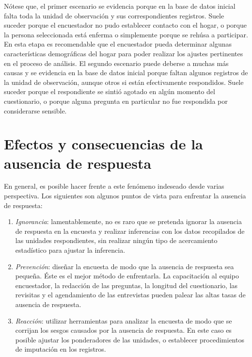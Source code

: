 \documentclass[
  12pt,
  spanish,
]{book}
\providecommand{\tightlist}{%
  \setlength{\itemsep}{0pt}\setlength{\parskip}{0pt}}
\begin{document}
Nótese que, el primer escenario se evidencia porque en la base de datos inicial falta toda la unidad de observación y sus correspondientes registros. Suele suceder porque el encuestador no pudo establecer contacto con el hogar, o porque la persona seleccionada está enferma o simplemente porque se rehúsa a participar. En esta etapa es recomendable que el encuestador pueda determinar algunas características demográficas del hogar para poder realizar los ajustes pertinentes en el proceso de análisis. El segundo escenario puede deberse a muchas más causas y se evidencia en la base de datos inicial porque faltan algunos registros de la unidad de observación, aunque otros si están efectivamente respondidos. Suele suceder porque el respondiente se sintió agotado en algún momento del cuestionario, o porque alguna pregunta en particular no fue respondida por considerarse sensible.

\hypertarget{efectos-y-consecuencias-de-la-ausencia-de-respuesta}{%
\section{Efectos y consecuencias de la ausencia de respuesta}\label{efectos-y-consecuencias-de-la-ausencia-de-respuesta}}

En general, es posible hacer frente a este fenómeno indeseado desde varias perspectiva. Los siguientes son algunos puntos de vista para enfrentar la ausencia de respuesta:

\begin{enumerate}
\def\labelenumi{\arabic{enumi}.}
\tightlist
\item
  \emph{Ignorancia}: lamentablemente, no es raro que se pretenda ignorar la ausencia de respuesta en la encuesta y realizar inferencias con los datos recopilados de las unidades respondientes, sin realizar ningún tipo de acercamiento estadístico para ajustar la inferencia.
\item
  \emph{Prevención}: diseñar la encuesta de modo que la ausencia de respuesta sea pequeña. Éste es el mejor método de enfrentarla. La capacitación al equipo encuestador, la redacción de las preguntas, la longitud del cuestionario, las revisitas y el agendamiento de las entrevistas pueden palear las altas tasas de ausencia de respuesta.
\item
  \emph{Reacción}: utilizar herramientas para analizar la encuesta de modo que se corrijan los sesgos causados por la ausencia de respuesta. En este caso es posible ajustar los ponderadores de las unidades, o establecer procedimientos de imputación en los registros.
\end{enumerate}
\end{document}
